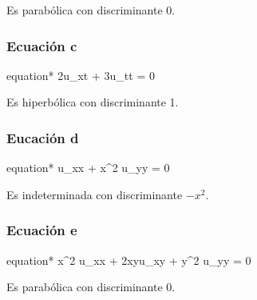 \documentclass[twoside,11pt]{TrabajosTex}
\begin{document}
	Es parabólica con discriminante 0.

	\subsubsection{Ecuación c}
	\begin{empheq}[box={\mybluebox[5pt]}]{equation*}
		2u_{xt} + 3u_{tt} = 0
	\end{empheq}
	
	Es hiperbólica con discriminante 1.

	\subsubsection{Eucación d}
	\begin{empheq}[box={\mybluebox[5pt]}]{equation*}
		u_{xx} + x^2 u_{yy} = 0
	\end{empheq}

	Es indeterminada con discriminante $-x^2$.
	\subsubsection{Ecuación e}
	\begin{empheq}[box={\mybluebox[5pt]}]{equation*}
		x^2 u_{xx} + 2xyu_{xy} + y^2 u_{yy} = 0
	\end{empheq}
	
	Es parabólica con discriminante 0.
\end{document}
